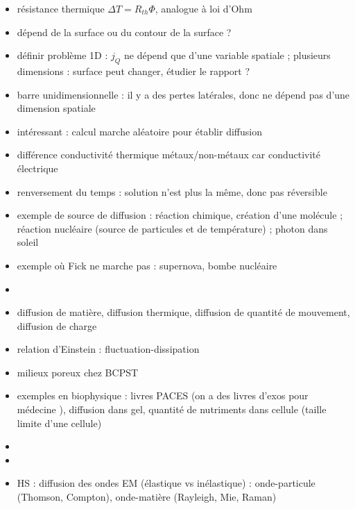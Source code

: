 \begin{remarques} \begin{itemize} 
\item résistance thermique $\Delta T = R_{th} \Phi$, analogue à loi d'Ohm
\item dépend de la surface ou du contour de la surface ?
\item définir problème 1D : $j_Q$ ne dépend que d'une variable spatiale ; plusieurs dimensions : surface peut changer, étudier le rapport ? 
\item barre unidimensionnelle : il y a des pertes latérales, donc ne dépend pas d'une dimension spatiale
\item intéressant : calcul marche aléatoire pour établir diffusion
\item différence conductivité thermique métaux/non-métaux car conductivité électrique
\item renversement du temps : solution n'est plus la même, donc pas réversible
\item exemple de source de diffusion : réaction chimique, création d'une molécule ; réaction nucléaire (source de particules et de température) ; photon dans soleil
\item exemple où Fick ne marche pas : supernova, bombe nucléaire 
\item 
\item diffusion de matière, diffusion thermique, diffusion de quantité de mouvement, diffusion de charge
\item relation d'Einstein : fluctuation-dissipation
\item milieux poreux chez BCPST
\item exemples en biophysique : livres PACES (on a des livres d'exos pour médecine \cite{biophysique}), diffusion dans gel, quantité de nutriments dans cellule (taille limite d'une cellule)  
\item 
\item 
\item HS : diffusion des ondes EM (élastique vs inélastique) : onde-particule (Thomson, Compton), onde-matière (Rayleigh, Mie, Raman)
\end{itemize} \end{remarques}
